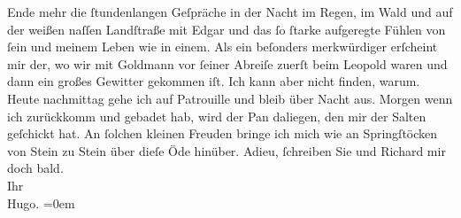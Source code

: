 \begin{ledgroupsized}[t]{13cm}
                    Ende mehr die ſtundenlangen Geſpräche in der Nacht im Regen, im Wald und auf der
                    weißen naſſen Landſtraße mit Edgar und das ſo
                    ſtarke aufgeregte Fühlen von ſein und meinem Leben wie in einem.\pend
           \pstart
           Als ein beſonders merkwürdiger \label{K_L00464_1v}\label{K_L00464_1h} erſcheint mir der, wo wir mit Goldmann vor ſeiner Abreiſe zuerſt beim Leopold waren und dann ein großes Gewitter
                    gekommen iſt. Ich kann aber nicht finden, warum.\pend
           \pstart
           {\pb}Heute nachmittag gehe ich
                    auf Patrouille und bleib über Nacht aus. Morgen wenn ich zurückkomm und gebadet
                    hab, wird der Pan daliegen, den mir der Salten geſchickt hat. An ſolchen kleinen
                    Freuden bringe ich mich wie an Springſtöcken von Stein zu Stein über dieſe Öde
                    hinüber.\pend
           \pstart
           Adieu, ſchreiben Sie und Richard mir
                    doch bald.{\\[\baselineskip]} Ihr{\\[\baselineskip]}\spacefill\mbox{Hugo.}\pend
           \leftskip=0em{}\endnumbering{}\end{ledgroupsized}  \newcommand{\dateiname}{L00464}\newcommand{\titel}{Hugo von Hofmannsthal an Arthur Schnitzler, 17. [7. 1895]}\newcommand{\editorInnen}{Martin Anton Müller und Gerd-Hermann Susen}
            \footnotesize
\begin{ledgroupsized}[t]{11.5cm}
\end{ledgroupsized}
         
      